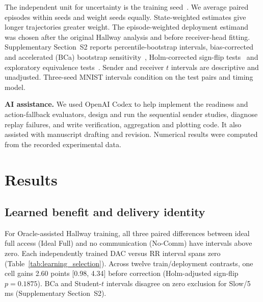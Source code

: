\documentclass[pdflatex,sn-mathphys-num]{sn-jnl}
\begin{document}
The independent unit for uncertainty is the training seed~\citep{agarwal2021deep}. We average paired episodes within seeds and weight seeds equally. State-weighted estimates give longer trajectories greater weight. The episode-weighted deployment estimand was chosen after the original Hallway analysis and before receiver-head fitting. Supplementary Section~S2 reports percentile-bootstrap intervals, bias-corrected and accelerated (BCa) bootstrap sensitivity~\citep{efron1987better}, Holm-corrected sign-flip tests~\citep{holm1979simple} and exploratory equivalence tests~\citep{schuirmann1987comparison}. Sender and receiver $t$ intervals are descriptive and unadjusted. Three-seed MNIST intervals condition on the test pairs and timing model.

\noindent\textbf{AI assistance.} We used OpenAI Codex to help implement the readiness and action-fallback evaluators, design and run the sequential sender studies, diagnose replay failures, and write verification, aggregation and plotting code. It also assisted with manuscript drafting and revision. Numerical results were computed from the recorded experimental data.

\section{Results}\label{sec:results}
\subsection{Learned benefit and delivery identity}\label{sec:learning}\label{sec:identity}
For Oracle-assisted Hallway training, all three paired differences between ideal full access (Ideal Full) and no communication (No-Comm) have intervals above zero. Each independently trained DAC versus RR interval spans zero (Table~\ref{tab:learning_selection}). Across twelve train/deployment contrasts, one cell gains 2.60 points [0.98, 4.34] before correction (Holm-adjusted sign-flip $p=0.1875$). BCa and Student-$t$ intervals disagree on zero exclusion for Slow/5 ms (Supplementary Section~S2).
\end{document}
